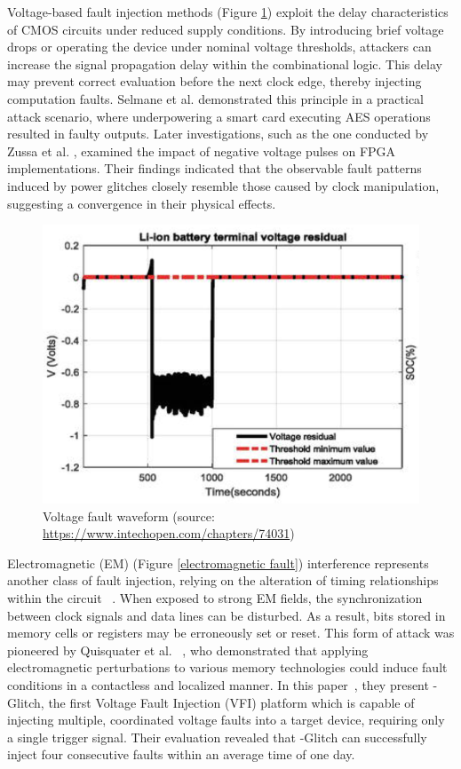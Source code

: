Voltage-based fault injection methods (Figure \ref{voltage fault}) exploit the delay characteristics of CMOS circuits under reduced supply conditions. By introducing brief voltage drops or operating the device under nominal voltage thresholds, attackers can increase the signal propagation delay within the combinational logic. This delay may prevent correct evaluation before the next clock edge, thereby injecting computation faults. Selmane et al. \cite{selmane2008practical} demonstrated this principle in a practical attack scenario, where underpowering a smart card executing AES operations resulted in faulty outputs. Later investigations, such as the one conducted by Zussa et al. \cite{zussa2013power}, examined the impact of negative voltage pulses on FPGA implementations. Their findings indicated that the observable fault patterns induced by power glitches closely resemble those caused by clock manipulation, suggesting a convergence in their physical effects.

\begin{figure}[t!]
  \centering
  \includegraphics[width=0.5\linewidth]{Chapitre1/figures/voltage.png}
  \caption{Voltage fault waveform (source: \url{https://www.intechopen.com/chapters/74031})}
  \label{voltage fault}
\end{figure}

Electromagnetic (EM) (Figure \ref{electromagnetic fault}) interference represents another class of fault injection, relying on the alteration of timing relationships within the circuit \cite{trouchkine2021electromagnetic} ~\cite{trouchkine2021fault}. When exposed to strong EM fields, the synchronization between clock signals and data lines can be disturbed. As a result, bits stored in memory cells or registers may be erroneously set or reset. This form of attack was pioneered by Quisquater et al. ~\cite{quisquater2002eddy}, who demonstrated that applying electromagnetic perturbations to various memory technologies could induce fault conditions in a contactless and localized manner. In this paper~\cite{sass2023oops}, they present \textmu-Glitch, the first Voltage Fault Injection (VFI) platform which is capable of injecting multiple, coordinated voltage faults into a target device, requiring only a single trigger signal. Their evaluation revealed that \textmu-Glitch can successfully inject four consecutive faults within an average time of one day.

